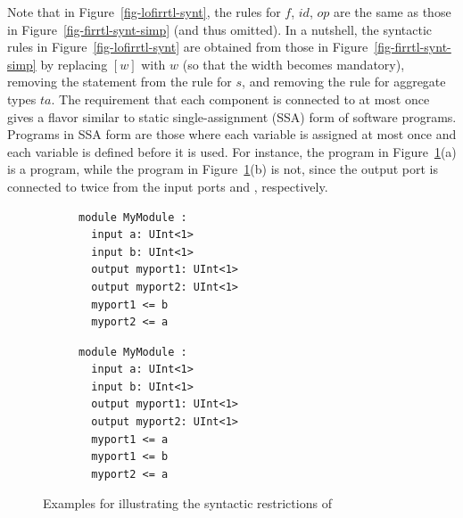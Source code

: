 Note that in Figure~\ref{fig-lofirrtl-synt}, the rules for $f$, $id$, $op$ are the same as those in Figure~\ref{fig-firrtl-synt-simp}  (and thus omitted). %
In a nutshell, the syntactic rules in Figure~\ref{fig-lofirrtl-synt} are obtained from those in Figure~\ref{fig-firrtl-synt-simp} by replacing $[w]$ with $w$ (so that the width becomes mandatory),
removing the  statement from the rule for $s$,
and removing the rule for aggregate types $ta$.
%
The requirement that each component is connected to at most once
gives {\lofirrtl} a flavor similar to static single-assignment (SSA) form of software programs.
Programs in SSA form are those where each variable is assigned at most once and each variable is defined before it is used.
For instance, the program in Figure~\ref{fig-lofirrtl-exmp}(a) is a {\lofirrtl} program,
while the program in Figure~\ref{fig-lofirrtl-exmp}(b) is not,
since the output port  is connected to twice from the input ports  and , respectively.
\begin{figure}[htbp]
\vspace{-2mm}
\centering
\begin{subfigure}[b]{0.4\textwidth}
         \centering
\begin{lstlisting}
module MyModule :
  input a: UInt<1>
  input b: UInt<1>
  output myport1: UInt<1>
  output myport2: UInt<1>
  myport1 <= b
  myport2 <= a
\end{lstlisting}
\vspace*{0.92\baselineskip}
\caption{}
\end{subfigure}
\hspace{4mm}
\begin{subfigure}[b]{0.4\textwidth}
         \centering
\begin{lstlisting}
module MyModule :
  input a: UInt<1>
  input b: UInt<1>
  output myport1: UInt<1>
  output myport2: UInt<1>
  myport1 <= a
  myport1 <= b
  myport2 <= a
\end{lstlisting}
\caption{}
\end{subfigure}
\vspace{-2mm}
\caption{Examples for illustrating the syntactic restrictions of {\lofirrtl}}
\label{fig-lofirrtl-exmp}
\vspace{-4mm}
\end{figure}


